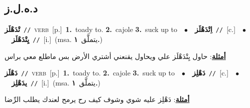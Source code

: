 \documentclass[10pt,a4paper,twoside]{article} %
\begin{document}
\begin{multicols}{2}
\vspace{-3mm}
\subsection*{\color{blue}\foreignlanguage{arabic}{د.ه.ل.ز}\color{blue}{}} 

{\setlength\topsep{0pt}\textbf{\foreignlanguage{arabic}{تْدَهْلَز}}\ {\color{gray}\texttt{//}\color{black}}\ \textsc{verb}\ [p.]\ \textbf{1.}~toady to.  \textbf{2.}~cajole  \textbf{3.}~suck up to\ \ $\bullet$\ \ \setlength\topsep{0pt}\textbf{\foreignlanguage{arabic}{اِتْدَهْلَز}}\ {\color{gray}\texttt{//}\color{black}}\ [c.]\ \ $\bullet$\ \ \setlength\topsep{0pt}\textbf{\foreignlanguage{arabic}{يِتْدَهْلَز}}\ {\color{gray}\texttt{//}\color{black}}\ [i.]\ \color{gray}(msa. \foreignlanguage{arabic}{يتملَّق}~\foreignlanguage{arabic}{\textbf{١.}})\color{black}\  \begin{flushright}\color{gray}\foreignlanguage{arabic}{\textbf{\underline{\foreignlanguage{arabic}{أمثلة}}}: حاول يِتْدَهْلَز علي ويحاول يقنعني أشتري الأرض بس ماطلع معي براس}\end{flushright}\color{black}} \vspace{2mm}

{\setlength\topsep{0pt}\textbf{\foreignlanguage{arabic}{دَهْلَز}}\ {\color{gray}\texttt{//}\color{black}}\ \textsc{verb}\ [p.]\ \textbf{1.}~toady to.  \textbf{2.}~cajole  \textbf{3.}~suck up to\ \ $\bullet$\ \ \setlength\topsep{0pt}\textbf{\foreignlanguage{arabic}{دَهْلِز}}\ {\color{gray}\texttt{//}\color{black}}\ [c.]\ \ $\bullet$\ \ \setlength\topsep{0pt}\textbf{\foreignlanguage{arabic}{يدَهْلِز}}\ {\color{gray}\texttt{//}\color{black}}\ [i.]\ \color{gray}(msa. \foreignlanguage{arabic}{يتملَّق}~\foreignlanguage{arabic}{\textbf{١.}})\color{black}\  \begin{flushright}\color{gray}\foreignlanguage{arabic}{\textbf{\underline{\foreignlanguage{arabic}{أمثلة}}}: دَهْلِز عليه شوي وشوف كيف رح يرمح لعندك يطلب الرِّضا}\end{flushright}\color{black}} \vspace{2mm}


\end{multicols}
\end{document}
